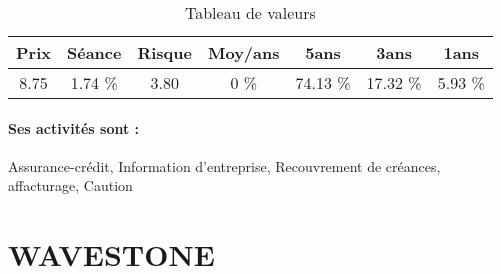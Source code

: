 \documentclass[11pt,a4paper]{report}%
\begin{document}
\begin{table}[H]
  \centering
    \begin{tabular}{|c|c|c|c|c|c|c|}
    \hline
    Prix & Séance & Risque  & Moy/ans & 5ans & 3ans & 1ans \\
    \hline
    8.75 &    1.74 \%    & 3.80 & 0 \% & 74.13 \% & 17.32 \% & 5.93 \% \\
    \hline
    \end{tabular}%
        \label{tab:table_COFACE}%
      \caption{Tableau de valeurs}
\end{table}%

\paragraph{Ses activités sont : } Assurance-crédit, Information d'entreprise, Recouvrement de créances, affacturage, Caution 
    
    \newpage

\section{WAVESTONE}
\end{document}
